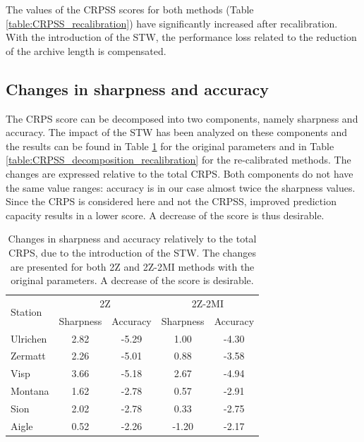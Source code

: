 \documentclass[hess]{copernicus}
\begin{document}
The values of the CRPSS scores for both methods (Table \ref{table:CRPSS_recalibration}) have significantly increased after recalibration. With the introduction of the STW, the performance loss related to the reduction of the archive length is compensated.


\subsection{Changes in sharpness and accuracy}

The CRPS score can be decomposed into two components, namely sharpness and accuracy. The impact of the STW has been analyzed on these components and the results can be found in Table \ref{table:CRPSS_decomposition_no_recalibration} for the original parameters and in Table \ref{table:CRPSS_decomposition_recalibration} for the re-calibrated methods. The changes are expressed relative to the total CRPS. Both components do not have the same value ranges: accuracy is in our case almost twice the sharpness values. Since the CRPS is considered here and not the CRPSS, improved prediction capacity results in a lower score. A decrease of the score is thus desirable.

\begin{table}[htb]
	\caption{Changes in sharpness and accuracy relatively to the total CRPS, due to the introduction of the STW. The changes are presented for both 2Z and 2Z-2MI methods with the original parameters. A decrease of the score is desirable.}
	\begin{center}
		\begin{tabular}{l c c c c}
			\hline
			\multirow{2}{*}{Station} & \multicolumn{2}{c}{2Z} & \multicolumn{2}{c}{2Z-2MI} \\
			& Sharpness & Accuracy & Sharpness & Accuracy \\
			\hline
			Ulrichen & 2.82 & -5.29 & 1.00 & -4.30 \\
			Zermatt & 2.26 & -5.01 & 0.88 & -3.58 \\
			Visp & 3.66 & -5.18 & 2.67 & -4.94 \\
			Montana & 1.62 & -2.78 & 0.57 & -2.91 \\
			Sion & 2.02 & -2.78 & 0.33 & -2.75 \\
			Aigle & 0.52 & -2.26 & -1.20 & -2.17 \\ 
			\hline
		\end{tabular}
	\end{center}
	\label{table:CRPSS_decomposition_no_recalibration}
\end{table}
\end{document}
